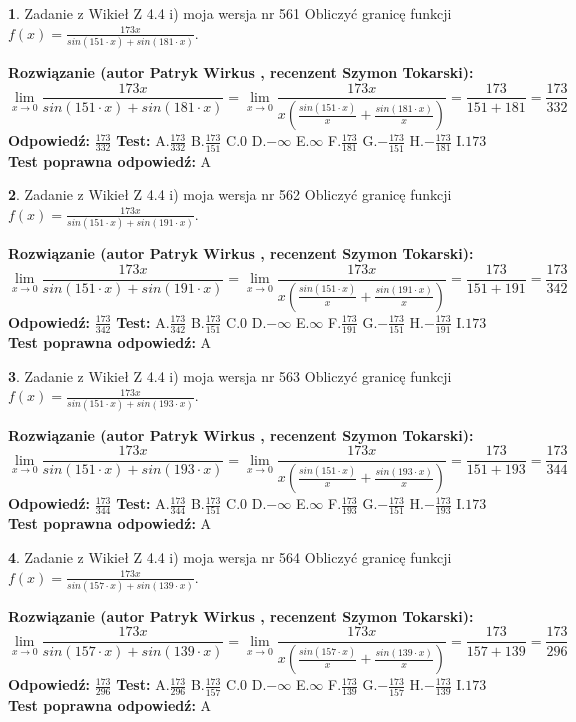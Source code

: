 \documentclass[12pt, a4paper]{article}
\theoremstyle{definition} %
\newtheorem{zad}{}
\newcommand{\zadStart}[1]{\begin{zad}#1\newline}
\newcommand{\zadStop}{\end{zad}}
\newcommand{\rozwStart}[2]{\noindent \textbf{Rozwiązanie (autor #1 , recenzent #2): }\newline}
\newcommand{\rozwStop}{\newline}
\newcommand{\odpStart}{\noindent \textbf{Odpowiedź:}\newline}
\newcommand{\odpStop}{\newline}
\newcommand{\testStart}{\noindent \textbf{Test:}\newline}
\newcommand{\testStop}{\newline}
\newcommand{\kluczStart}{\noindent \textbf{Test poprawna odpowiedź:}\newline}
\newcommand{\kluczStop}{\newline}
\begin{document}
\zadStart{Zadanie z Wikieł Z 4.4 i) moja wersja nr 561}
Obliczyć granicę funkcji $f(x)=\frac{173x}{sin(151\cdot x) +sin(181\cdot x)}$.
\zadStop
\rozwStart{Patryk Wirkus}{Szymon Tokarski}
$$\lim\limits_{x\to 0}\frac{173x}{sin(151\cdot x) +sin(181\cdot x)}=\lim\limits_{x\to 0}\frac{173x}{x(\frac{sin(151\cdot x)}{x}+\frac{sin(181\cdot x)}{x})}=\frac{173}{151+181} = \frac{173}{332}$$
\rozwStop
\odpStart
$\frac{173}{332}$
\odpStop
\testStart
A.$\frac{173}{332}$
B.$\frac{173}{151}$
C.$0$
D.$-\infty$
E.$\infty$
F.$\frac{173}{181}$
G.$-\frac{173}{151}$
H.$-\frac{173}{181}$
I.$173$
\testStop
\kluczStart
A
\kluczStop



\zadStart{Zadanie z Wikieł Z 4.4 i) moja wersja nr 562}
Obliczyć granicę funkcji $f(x)=\frac{173x}{sin(151\cdot x) +sin(191\cdot x)}$.
\zadStop
\rozwStart{Patryk Wirkus}{Szymon Tokarski}
$$\lim\limits_{x\to 0}\frac{173x}{sin(151\cdot x) +sin(191\cdot x)}=\lim\limits_{x\to 0}\frac{173x}{x(\frac{sin(151\cdot x)}{x}+\frac{sin(191\cdot x)}{x})}=\frac{173}{151+191} = \frac{173}{342}$$
\rozwStop
\odpStart
$\frac{173}{342}$
\odpStop
\testStart
A.$\frac{173}{342}$
B.$\frac{173}{151}$
C.$0$
D.$-\infty$
E.$\infty$
F.$\frac{173}{191}$
G.$-\frac{173}{151}$
H.$-\frac{173}{191}$
I.$173$
\testStop
\kluczStart
A
\kluczStop



\zadStart{Zadanie z Wikieł Z 4.4 i) moja wersja nr 563}
Obliczyć granicę funkcji $f(x)=\frac{173x}{sin(151\cdot x) +sin(193\cdot x)}$.
\zadStop
\rozwStart{Patryk Wirkus}{Szymon Tokarski}
$$\lim\limits_{x\to 0}\frac{173x}{sin(151\cdot x) +sin(193\cdot x)}=\lim\limits_{x\to 0}\frac{173x}{x(\frac{sin(151\cdot x)}{x}+\frac{sin(193\cdot x)}{x})}=\frac{173}{151+193} = \frac{173}{344}$$
\rozwStop
\odpStart
$\frac{173}{344}$
\odpStop
\testStart
A.$\frac{173}{344}$
B.$\frac{173}{151}$
C.$0$
D.$-\infty$
E.$\infty$
F.$\frac{173}{193}$
G.$-\frac{173}{151}$
H.$-\frac{173}{193}$
I.$173$
\testStop
\kluczStart
A
\kluczStop



\zadStart{Zadanie z Wikieł Z 4.4 i) moja wersja nr 564}
Obliczyć granicę funkcji $f(x)=\frac{173x}{sin(157\cdot x) +sin(139\cdot x)}$.
\zadStop
\rozwStart{Patryk Wirkus}{Szymon Tokarski}
$$\lim\limits_{x\to 0}\frac{173x}{sin(157\cdot x) +sin(139\cdot x)}=\lim\limits_{x\to 0}\frac{173x}{x(\frac{sin(157\cdot x)}{x}+\frac{sin(139\cdot x)}{x})}=\frac{173}{157+139} = \frac{173}{296}$$
\rozwStop
\odpStart
$\frac{173}{296}$
\odpStop
\testStart
A.$\frac{173}{296}$
B.$\frac{173}{157}$
C.$0$
D.$-\infty$
E.$\infty$
F.$\frac{173}{139}$
G.$-\frac{173}{157}$
H.$-\frac{173}{139}$
I.$173$
\testStop
\kluczStart
A
\kluczStop
\end{document}
